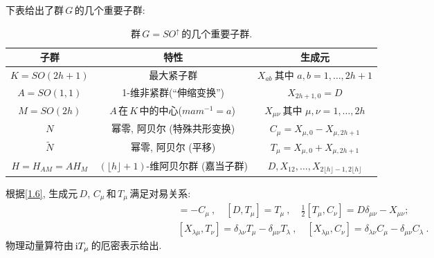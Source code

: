 下表给出了群$\,G\,$的几个重要子群:
\begin{table}[h]
\centering
        \begin{tabular}{ c c c }
         子群 & 特性 & 生成元 \\ \hline
         $K=SO(2h{+}1)$ & 最大紧子群 & $X_{ab}\:\text{其中  } a,b=1,\ldots,2h{+}1$ \\  
         $A=SO(1,1)$ & 1-维非紧群(``伸缩变换'') & $X_{2h{+}1,0}=D$ \\
         $M=SO(2h)$  & $A\,$在$\,K\,$中的中心($mam^{-1}=a$)\, & $X_{\mu\nu}\:\text{其中  } \mu,\nu=1,\ldots,2h$ \\  
         $N$ & 幂零, 阿贝尔 (特殊共形变换) & $C_{\mu}=X_{\mu,0}-X_{\mu,2h+1}$ \\
         $\tilde{N}$ & 幂零, 阿贝尔 (平移) & $T_{\mu}=X_{\mu,0}+X_{\mu,2h+1}$ \\
         $H=H_{AM}=AH_{M}$ & $(\lfloor h\rfloor{+}1)$-维阿贝尔群 (嘉当子群) & $D, X_{12},\ldots,X_{2\lfloor h\rfloor-1,2\lfloor h\rfloor}$ 
        \end{tabular}
        \caption{群$\,G=SO^{\uparrow}\,$的几个重要子群.}
\label{tab:1}
\end{table}

根据\eqref{1.6}, 生成元$\,D$, $C_{\mu}\,$和$\,T_{\mu}\,$满足对易关系:
\begin{align*}
    [D,C_{\mu}]=-C_{\mu}\:, \quad [D,T_{\mu}]=T_{\mu}\:,\quad \tfrac{1}{2}[T_{\mu},C_{\nu}]=D\delta_{\mu\nu}-X_{\mu\nu}; \nonumber \\
    [X_{\lambda\mu},T_{\nu}]=\delta_{\lambda\nu}T_{\mu}-\delta_{\mu\nu}T_{\lambda} \:, \quad 
    [X_{\lambda\mu},C_{\nu}]=\delta_{\lambda\nu}C_{\mu}-\delta_{\mu\nu}C_{\lambda} \:. \label{1.6'} \tag{1.6$'$}
\end{align*}
物理动量算符由$\,\mathrm{i} T_{\mu}\,$的厄密表示给出.

